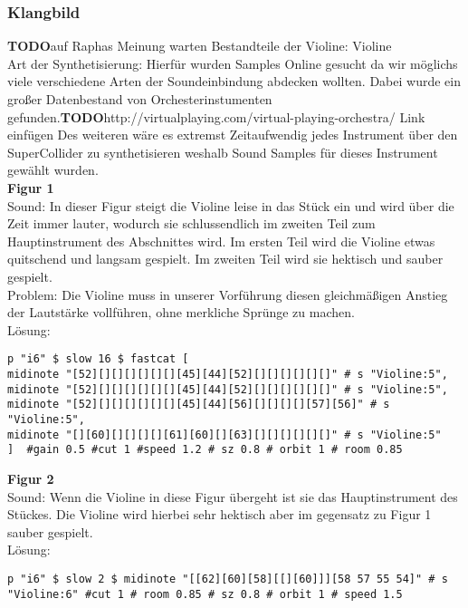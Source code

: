 \documentclass[
10pt, %
a4paper, %
oneside, %
headinclude,footinclude, %
BCOR5mm, %
]{scrartcl}
\begin{document}
\subsubsection{Klangbild}
{\color{red}\textbf{TODO}}auf Raphas Meinung warten
Bestandteile der Violine: Violine\\
Art der Synthetisierung: Hierfür wurden Samples Online gesucht da wir möglichs viele verschiedene Arten der Soundeinbindung abdecken wollten. Dabei wurde ein großer Datenbestand von Orchesterinstumenten gefunden.{\color{red}\textbf{TODO}}http://virtualplaying.com/virtual-playing-orchestra/ Link einfügen Des weiteren
wäre es extremst Zeitaufwendig jedes Instrument über den SuperCollider zu synthetisieren weshalb Sound Samples für dieses Instrument gewählt wurden.\\
\noindent\textbf{Figur 1}\\
Sound: In dieser Figur steigt die Violine leise in das Stück ein und wird über die Zeit immer lauter, wodurch sie schlussendlich im zweiten Teil 
zum Hauptinstrument des Abschnittes wird. Im ersten Teil wird die Violine etwas quitschend und langsam gespielt. Im zweiten Teil wird sie hektisch und sauber gespielt.\\
Problem: Die Violine muss in unserer Vorführung diesen gleichmäßigen Anstieg der Lautstärke vollführen, ohne merkliche Sprünge zu machen.\\
Lösung:\\
\begin{lstlisting}
p "i6" $ slow 16 $ fastcat [
midinote "[52][][][][][][][45][44][52][][][][][][]" # s "Violine:5",
midinote "[52][][][][][][][45][44][52][][][][][][]" # s "Violine:5",
midinote "[52][][][][][][][45][44][56][][][][][57][56]" # s "Violine:5",
midinote "[][60][][][][][61][60][][63][][][][][][]" # s "Violine:5"
]  #gain 0.5 #cut 1 #speed 1.2 # sz 0.8 # orbit 1 # room 0.85

\end{lstlisting}
\noindent\textbf{Figur 2}\\
Sound: Wenn die Violine in diese Figur übergeht ist sie das Hauptinstrument des Stückes. Die Violine wird hierbei sehr hektisch aber im gegensatz zu Figur 1 sauber gespielt.\\
Lösung:\\
\begin{lstlisting}
p "i6" $ slow 2 $ midinote "[[62][60][58][[][60]]][58 57 55 54]" # s "Violine:6" #cut 1 # room 0.85 # sz 0.8 # orbit 1 # speed 1.5
\end{lstlisting}
\end{document}
